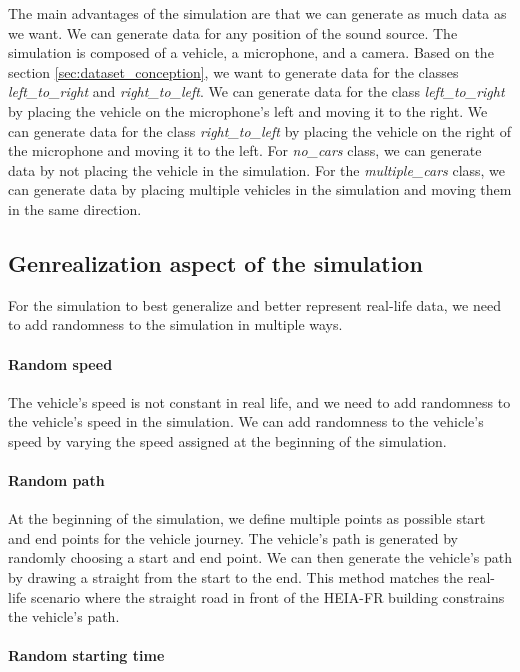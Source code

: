 The main advantages of the simulation are that we can generate as much data as we want. We can generate data for any position of the sound source. The simulation is composed of a vehicle, a microphone, and a camera. Based on the section \ref{sec:dataset_conception}, we want to generate data for the classes \textit{left\_to\_right} and \textit{right\_to\_left}. We can generate data for the class \textit{left\_to\_right} by placing the vehicle on the microphone's left and moving it to the right. We can generate data for the class \textit{right\_to\_left} by placing the vehicle on the right of the microphone and moving it to the left. For \textit{no\_cars} class, we can generate data by not placing the vehicle in the simulation. For the \textit{multiple\_cars} class, we can generate data by placing multiple vehicles in the simulation and moving them in the same direction. 

\subsection{Genrealization aspect of the simulation}

For the simulation to best generalize and better represent real-life data, we need to add randomness to the simulation in multiple ways. 

\paragraph{Random speed}

The vehicle's speed is not constant in real life, and we need to add randomness to the vehicle's speed in the simulation. We can add randomness to the vehicle's speed by varying the speed assigned at the beginning of the simulation. 

\paragraph{Random path}

At the beginning of the simulation, we define multiple points as possible start and end points for the vehicle journey. The vehicle's path is generated by randomly choosing a start and end point. We can then generate the vehicle's path by drawing a straight from the start to the end. This method matches the real-life scenario where the straight road in front of the HEIA-FR building constrains the vehicle's path. 

\paragraph{Random starting time}

